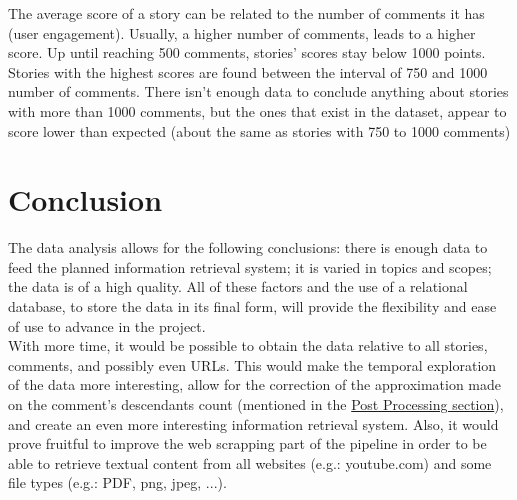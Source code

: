 \documentclass[sigconf]{acmart}
\begin{document}
The average score of a story can be related to the number of comments it
has (user engagement). Usually, a higher number of comments, leads to a
higher score. Up until reaching 500 comments, stories' scores stay below
1000 points. Stories with the highest scores  are found between
the interval of 750 and 1000 number of comments. There isn't enough data
to conclude anything about stories with more than 1000 comments, but the
ones that exist in the dataset, appear to score lower than expected
(about the same as stories with 750 to 1000 comments)
 
\section{Conclusion}
The data analysis allows for the following conclusions: there is enough
data to feed the planned information retrieval system; it is varied in
topics and scopes; the data is of a high quality. All of these factors
and the use of a relational database, to store the data in its final form,
will provide the flexibility and ease of use to advance in the project.\\
With more time, it would be possible to obtain the data relative to all
stories, comments, and possibly even URLs. This would make the temporal
exploration of the data more interesting, allow for the correction of
the approximation made on the comment's descendants count (mentioned in the
\hyperref[sec:post_processing]{Post Processing section}), and create an
even more interesting information retrieval system. Also, it would prove
fruitful to improve the web scrapping part of the pipeline in order to
be able to retrieve textual content from all websites (e.g.: youtube.com)
and some file types (e.g.: PDF, png, jpeg, ...).



\end{document}
